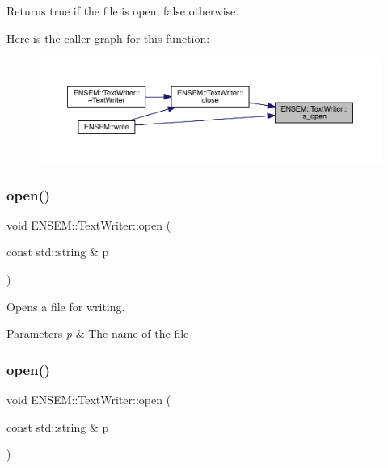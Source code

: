 \begin{DoxyReturn}{Returns}
true if the file is open; false otherwise. 
\end{DoxyReturn}
Here is the caller graph for this function\+:
\nopagebreak
\begin{figure}[H]
\begin{center}
\leavevmode
\includegraphics[width=350pt]{db/d53/classENSEM_1_1TextWriter_a6718d81018fe6a709f11cdb2f008c68b_icgraph}
\end{center}
\end{figure}
\mbox{\label{classENSEM_1_1TextWriter_a8a7bdd80e930dd002d3af693e5a2cb95}} 
\subsubsection{\texorpdfstring{open()}{open()}\hspace{0.1cm}{\footnotesize\ttfamily [1/3]}}
{\footnotesize\ttfamily void E\+N\+S\+E\+M\+::\+Text\+Writer\+::open (\begin{DoxyParamCaption}\item[{const std\+::string \&}]{p }\end{DoxyParamCaption})}

Opens a file for writing. 
\begin{DoxyParams}{Parameters}
{\em p} & The name of the file \\
\hline
\end{DoxyParams}
\mbox{\label{classENSEM_1_1TextWriter_a8a7bdd80e930dd002d3af693e5a2cb95}} 
\subsubsection{\texorpdfstring{open()}{open()}\hspace{0.1cm}{\footnotesize\ttfamily [2/3]}}
{\footnotesize\ttfamily void E\+N\+S\+E\+M\+::\+Text\+Writer\+::open (\begin{DoxyParamCaption}\item[{const std\+::string \&}]{p }\end{DoxyParamCaption})}

